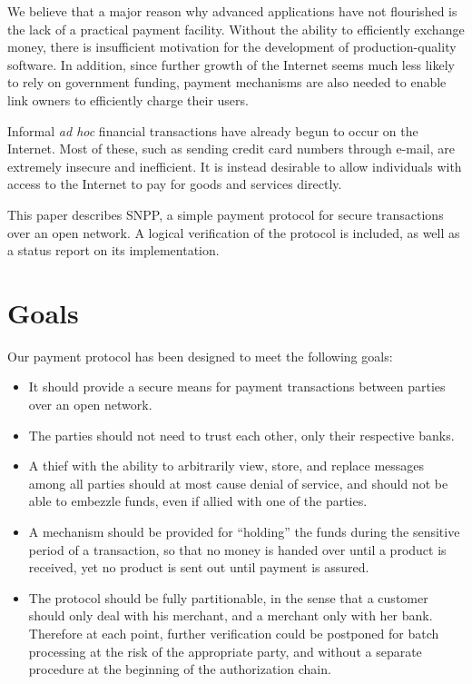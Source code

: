 We believe that a major reason why advanced applications
have not flourished is the lack of a practical payment facility.
Without the ability to efficiently exchange money, there is
insufficient motivation for the development of production-quality
software.  In addition, since further growth of the Internet seems
much less likely to rely on government funding, payment mechanisms are
also needed to enable link owners to efficiently charge their users.

Informal {\it ad hoc\/} financial transactions have already begun to occur on
the Internet.  Most of these, such as sending credit card numbers
through e-mail, are extremely insecure and inefficient.  It is instead
desirable to allow individuals with access to the Internet to pay for
goods and services directly.

This paper describes SNPP, a simple payment protocol for secure
transactions over an open network.  A logical verification of the
protocol is included, as well as a status report on its
implementation.

\section{Goals}

Our payment protocol has been designed to meet the following
goals:
\begin{itemize}
\item It should provide a secure means
for payment transactions between parties over an open network.

\item The parties
should not need to trust each other, only their respective banks.

\item A thief with the
ability to arbitrarily view, store, and replace messages among all parties
should at most cause denial of service, and should not be able to
embezzle funds, even if allied with one of the parties.

\item   A mechanism should be provided for
``holding'' the funds during the sensitive period of a transaction, so that
no money is handed over until a product is received, yet no product is
sent out until payment is assured.

\item The protocol should be fully
partitionable, in the sense that a customer should only deal with his merchant,
and a merchant only with her bank. Therefore at each point, further
verification could be postponed for batch processing at the risk of the
appropriate party, and without a separate procedure at the beginning of the
authorization chain.

\end{itemize}

